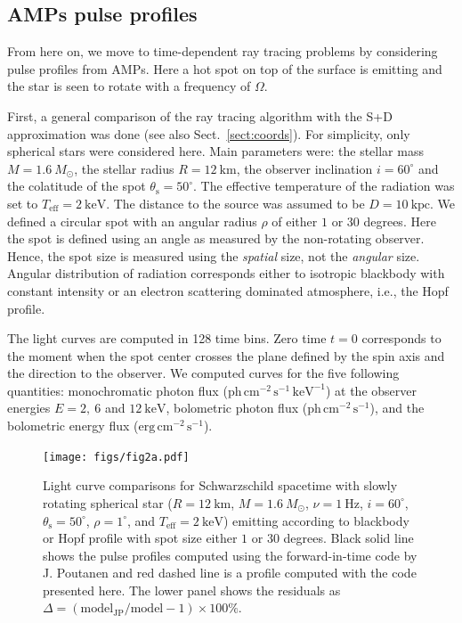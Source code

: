 \documentclass{aa}
\newcommand{\sch}{Schwarzschild }
\newcommand{\Msun}{\ensuremath{M_{\odot}}}
\begin{document}
\subsection{AMPs pulse profiles}\label{sect:AMPs}

From here on, we move to time-dependent ray tracing problems by considering pulse profiles from AMPs.
Here a hot spot on top of the surface is emitting and the star is seen to rotate with a frequency of $\Omega$.



First, a general comparison of the ray tracing algorithm with the S+D approximation \citep{PB06} was done (see also Sect.~\ref{sect:coords}).
For simplicity, only spherical stars were considered here.
Main parameters were: the stellar mass $M = 1.6~\Msun$, the stellar radius $R = 12~\mathrm{km}$, the observer inclination $i = 60^{\circ}$ and the colatitude of the spot $\theta_{\mathrm{s}} = 50^{\circ}$.  
The effective temperature of the radiation was set to $T_{\mathrm{eff}} = 2~\mathrm{keV}$.  
The distance to the source was assumed to be $D = 10~\mathrm{kpc}$.  
We defined a circular spot with an angular radius $\rho$ of either $1$ or $30$ degrees.
Here the spot is defined using an angle as measured by the non-rotating observer.
Hence, the spot size is measured using the \textit{spatial} size, not the \textit{angular} size.
Angular distribution of radiation corresponds either to isotropic blackbody with constant intensity or an electron scattering dominated atmosphere, i.e., the Hopf profile.


The light curves are computed in 128 time bins.  Zero time $t = 0$ corresponds to the moment when the spot center crosses the plane defined by the spin axis and the direction to the observer.  
We computed curves for the five following quantities: monochromatic photon flux ($\mathrm{ph}\,\mathrm{cm}^{-2}\,\mathrm{s}^{-1}\,\mathrm{keV}^{-1}$) at the observer energies $E = 2,~6$ and $12~\mathrm{keV}$, bolometric photon flux ($\mathrm{ph}\,\mathrm{cm}^{-2}\,\mathrm{s}^{-1}$), and the bolometric energy flux ($\mathrm{erg}\,\mathrm{cm}^{-2}\,\mathrm{s}^{-1}$).


\begin{figure}
\centering
\texttt{[image: figs/fig2a.pdf]}
\caption{\label{fig:sch_comp1}
  Light curve comparisons for \sch spacetime with slowly rotating spherical star ($R = 12~\mathrm{km}$, $M = 1.6~\Msun$, $\nu = 1~\mathrm{Hz}$, $i = 60^{\circ}$, $\theta_{\mathrm{s}} = 50^{\circ}$, $\rho = 1^{\circ}$, and $T_{\mathrm{eff}} = 2~\mathrm{keV}$) emitting according to blackbody or Hopf profile with spot size either $1$ or $30$ degrees.
  Black solid line shows the pulse profiles computed using the forward-in-time code by J. Poutanen and red dashed line is a profile computed with the code presented here.
  The lower panel shows the residuals as $\Delta = (\mathrm{model_{JP}}/\mathrm{model} -1) \times 100\%$.
}
\end{figure}
\end{document}
